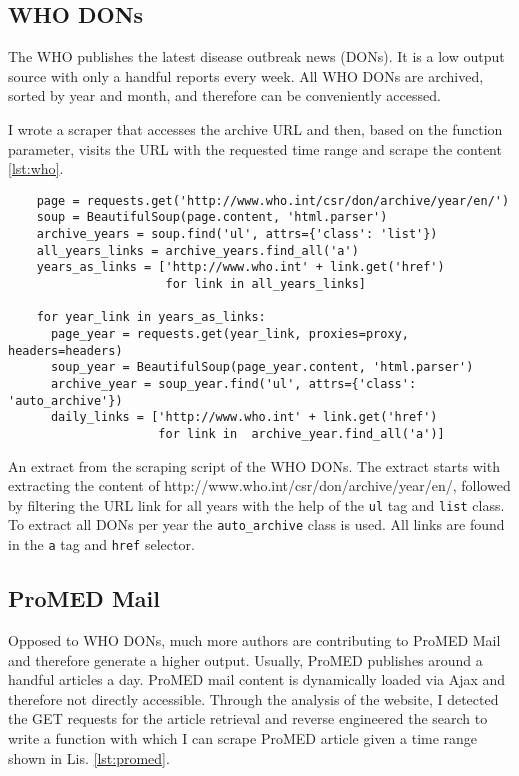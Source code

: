 \subsection{WHO DONs}
The WHO publishes the latest disease outbreak news (DONs).
It is a low output source with only a handful reports every week.
All WHO DONs are archived, sorted by year and month, and therefore can be conveniently accessed.

I wrote a scraper that accesses the archive URL and then, based on the function parameter, visits the URL with the requested time range and scrape the content \ref{lst:who}.

\begin{listing}[h]
  \begin{verbatim}
    page = requests.get('http://www.who.int/csr/don/archive/year/en/')
    soup = BeautifulSoup(page.content, 'html.parser')
    archive_years = soup.find('ul', attrs={'class': 'list'})
    all_years_links = archive_years.find_all('a')
    years_as_links = ['http://www.who.int' + link.get('href')
                      for link in all_years_links]

    for year_link in years_as_links:
      page_year = requests.get(year_link, proxies=proxy, headers=headers)
      soup_year = BeautifulSoup(page_year.content, 'html.parser')
      archive_year = soup_year.find('ul', attrs={'class': 'auto_archive'})
      daily_links = ['http://www.who.int' + link.get('href')
                     for link in  archive_year.find_all('a')]
  \end{verbatim}
  \caption{An extract from the scraping script of the WHO DONs. The extract starts with extracting the content of \textquotesingle http://www.who.int/csr/don/archive/year/en/\textquotesingle, followed by filtering the URL link for all years with the help of the \texttt{ul} tag and \texttt{list} class. To extract all DONs per year the \texttt{auto\_archive} class is used. All links are found in the \texttt{a} tag and \texttt{href} selector.}
  \label{lst:who}
\end{listing}

\subsection{ProMED Mail}
Opposed to WHO DONs, much more authors are contributing to ProMED Mail and therefore generate a higher output. Usually, ProMED publishes around a handful articles a day. ProMED mail content is dynamically loaded via Ajax and therefore not directly accessible. Through the analysis of the website, I detected the GET requests for the article retrieval and reverse engineered the search to write a function with which I can scrape ProMED article given a time range shown in Lis. \ref{lst:promed}.

